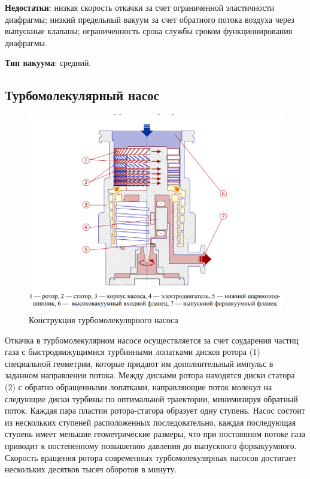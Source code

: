 \documentclass[a4paper, 12pt]{article} %
\begin{document}
\textbf{Недостатки}: низкая скорость откачки за счет ограниченной эластичности диафрагмы; низкий предельный вакуум за счет обратного потока воздуха через выпускные клапаны; ограниченность срока службы
сроком функционирования диафрагмы.

\textbf{Тип вакуума}: средний.

\subsection{Турбомолекулярный насос}

\begin{figure}[h]
    \centering
    \includegraphics[width = 12 cm]{ТМН}
    \caption{Конструкция турбомолекулярного насоса}
    \label{fig:vac}
\end{figure}

Откачка в турбомолекулярном насосе осуществляется за
счет соударения частиц газа с быстродвижущимися турбинными лопатками дисков ротора (1) специальной геометрии, которые придают им дополнительный импульс в заданном направлении потока. Между дисками ротора находятся диски статора (2) с обратно обращенными лопатками, направляющие поток молекул на следующие диски турбины по оптимальной траектории, минимизируя обратный поток. Каждая пара пластин ротора-статора образует одну ступень. Насос состоит из нескольких ступеней расположенных последовательно, каждая последующая ступень имеет меньшие геометрические размеры, что при постоянном потоке
газа приводит к постепенному повышению давления до выпускного форвакуумного. Скорость вращения ротора современных турбомолекулярных
насосов достигает нескольких десятков тысяч оборотов в минуту.
\end{document}
